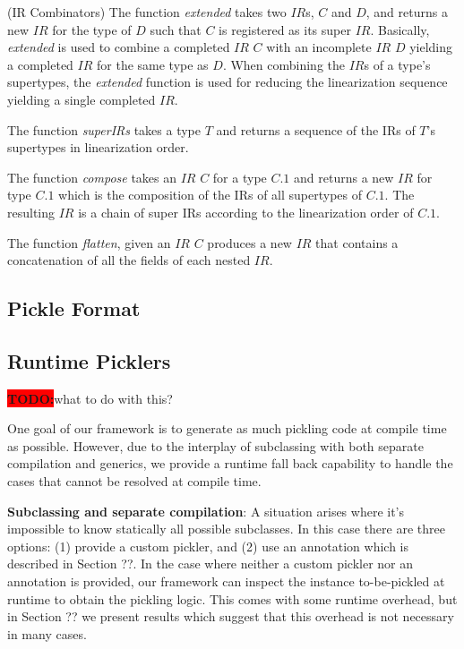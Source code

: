 \documentclass[preprint,10pt]{sigplanconf}
\theoremstyle{definition}
\newcommand{\todo}{{\bf \colorbox{red}{\color{white}TODO:}}}
\begin{document}
\begin{defn}{(IR Combinators)}
The function \textit{extended} takes two $IR$s, $C$ and $D$, and returns a new
$IR$ for the type of $D$ such that $C$ is registered as its super $IR$.
Basically, \textit{extended} is used to combine a completed $IR$ $C$ with an
incomplete $IR$ $D$ yielding a completed $IR$ for the same type as $D$. When
combining the $IR$s of a type's supertypes, the \textit{extended} function is
used for reducing the linearization sequence yielding a single completed $IR$.

The function \textit{superIRs} takes a type $T$ and returns a sequence of the
IRs of $T$'s supertypes in linearization order.

The function \textit{compose} takes an $IR$ $C$ for a type $C.1$ and returns a
new $IR$ for type $C.1$ which is the composition of the IRs of all supertypes
of $C.1$. The resulting $IR$ is a chain of super IRs according to the
linearization order of $C.1$.

The function \textit{flatten}, given an $IR$ $C$ produces a new $IR$ that
contains a concatenation of all the fields of each nested $IR$.

\end{defn}

\subsection{Pickle Format}

\subsection{Runtime Picklers}

\todo what to do with this?

One goal of our framework is to generate as much pickling code at compile time as possible. However, due to the interplay of subclassing with both separate compilation and generics, we provide a runtime fall back capability to handle the cases that cannot be resolved at compile time.

{\bf Subclassing and separate compilation}: A situation arises where it's impossible to know statically all possible subclasses. In this case there are three options: (1) provide a custom pickler, and (2) use an annotation which is described in Section ??. In the case where neither a custom pickler nor an annotation is provided, our framework can inspect the instance to-be-pickled at runtime to obtain the pickling logic. This comes with some runtime overhead, but in Section ?? we present results which suggest that this overhead is not necessary in many cases.
\end{document}
